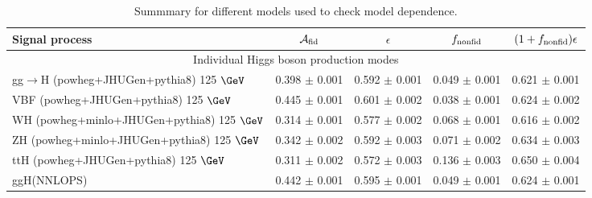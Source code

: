 \documentclass{article}
\begin{document}
\begin{table}[!h!tb]
\begin{center}
\small
\caption{
Summmary for different models used to check model dependence.
\label{tab:summaryExo}
}
\begin{tabular}{|l|c|c|c|c|} \hline \hline 
\textbf{Signal process} & $\mathcal{A}_{\rm fid}$ & $\epsilon$ & $f_{\rm nonfid}$  & $(1+f_{\rm nonfid})\epsilon$ \\ \hline \hline 
\multicolumn{5}{|c|}{Individual Higgs boson production modes} \\ \hline 
gg$\rightarrow$H ({\sc powheg+JHUGen+pythia8}) 125 $\GeV$ & 0.398 $\pm$ 0.001 & 0.592 $\pm$ 0.001 & 0.049 $\pm$ 0.001 & 0.621 $\pm$ 0.001 \\ 
 VBF ({\sc powheg+JHUGen+pythia8}) 125 $\GeV$ & 0.445 $\pm$ 0.001 & 0.601 $\pm$ 0.002 & 0.038 $\pm$ 0.001 & 0.624 $\pm$ 0.002 \\ 
 WH ({\sc powheg+minlo+JHUGen+pythia8}) 125 $\GeV$ & 0.314 $\pm$ 0.001 & 0.577 $\pm$ 0.002 & 0.068 $\pm$ 0.001 & 0.616 $\pm$ 0.002 \\ 
 ZH ({\sc powheg+minlo+JHUGen+pythia8}) 125 $\GeV$ & 0.342 $\pm$ 0.002 & 0.592 $\pm$ 0.003 & 0.071 $\pm$ 0.002 & 0.634 $\pm$ 0.003 \\ 
 ttH ({\sc powheg+JHUGen+pythia8}) 125 $\GeV$ & 0.311 $\pm$ 0.002 & 0.572 $\pm$ 0.003 & 0.136 $\pm$ 0.003 & 0.650 $\pm$ 0.004 \\ 
 ggH(NNLOPS) & 0.442 $\pm$ 0.001 & 0.595 $\pm$ 0.001 & 0.049 $\pm$ 0.001 & 0.624 $\pm$ 0.001 \\ 
 
\hline \hline
\end{tabular}
\normalsize
\end{center}
\end{table}
 
 
 
\end{document}

